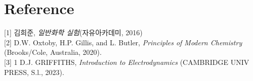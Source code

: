 \documentclass[%
 reprint,
 amsmath,amssymb,
 aps,
]{revtex4-2}
\begin{document}
\section{\label{sec:level1}Reference}
[1] 김희준, \textit{일반화학 실험}(자유아카데미, 2016)\\

[2] D.W. Oxtoby, H.P. Gillis, and L. Butler, \textit{Principles of Modern Chemistry} (Brooks/Cole, Australia, 2020). \\

[3] 1 D.J. GRIFFITHS, \textit{Introduction to Electrodynamics} (CAMBRIDGE UNIV PRESS, S.l., 2023). 
\end{document}
